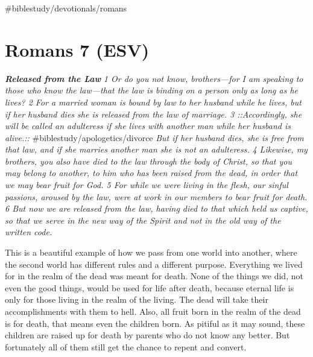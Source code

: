 \#biblestudy/devotionals/romans

\hypertarget{romans-7-esv}{%
\section{Romans 7 (ESV)}\label{romans-7-esv}}

\textbf{\emph{Released from the Law}} \emph{1 Or do you not know,
brothers---for I am speaking to those who know the law---that the law is
binding on a person only as long as he lives? 2 For a married woman is
bound by law to her husband while he lives, but if her husband dies she
is released from the law of marriage. 3 ::Accordingly, she will be
called an adulteress if she lives with another man while her husband is
alive.::} \#biblestudy/apologetics/divorce \emph{But if her husband
dies, she is free from that law, and if she marries another man she is
not an adulteress.} \emph{4 Likewise, my brothers, you also have died to
the law through the body of Christ, so that you may belong to another,
to him who has been raised from the dead, in order that we may bear
fruit for God. 5 For while we were living in the flesh, our sinful
passions, aroused by the law, were at work in our members to bear fruit
for death. 6 But now we are released from the law, having died to that
which held us captive, so that we serve in the new way of the Spirit and
not in the old way of the written code.}

This is a beautiful example of how we pass from one world into another,
where the second world has different rules and a different purpose.
Everything we lived for in the realm of the dead was meant for death.
None of the things we did, not even the good things, would be used for
life after death, because eternal life is only for those living in the
realm of the living. The dead will take their accomplishments with them
to hell. Also, all fruit born in the realm of the dead is for death,
that means even the children born. As pitiful as it may sound, these
children are raised up for death by parents who do not know any better.
But fortunately all of them still get the chance to repent and convert.

